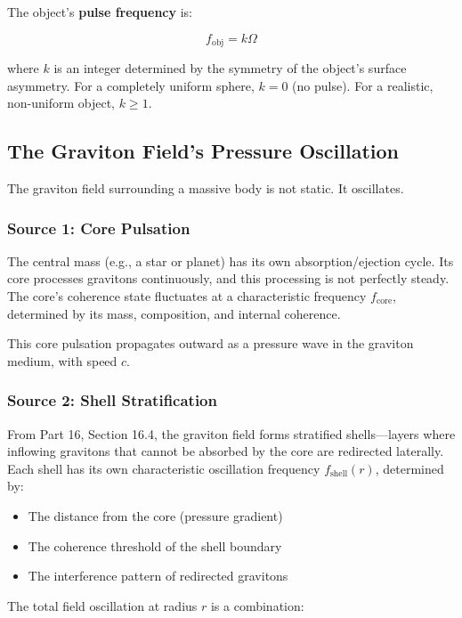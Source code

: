 \documentclass[12pt, a4paper]{article}
\begin{document}
The object's \textbf{pulse frequency} is:

\[
f_{\text{obj}} = k\Omega
\]

where \( k \) is an integer determined by the symmetry of the object's surface asymmetry. For a completely uniform sphere, \( k = 0 \) (no pulse). For a realistic, non-uniform object, \( k \geq 1 \).

\subsection{The Graviton Field's Pressure Oscillation}
\label{subsec:field_oscillation}

The graviton field surrounding a massive body is not static. It oscillates.

\subsubsection{Source 1: Core Pulsation}

The central mass (e.g., a star or planet) has its own absorption/ejection cycle. Its core processes gravitons continuously, and this processing is not perfectly steady. The core's coherence state fluctuates at a characteristic frequency \( f_{\text{core}} \), determined by its mass, composition, and internal coherence.

This core pulsation propagates outward as a pressure wave in the graviton medium, with speed \( c \).

\subsubsection{Source 2: Shell Stratification}
\label{subsec:shell_stratification}

From Part 16, Section 16.4, the graviton field forms stratified shells—layers where inflowing gravitons that cannot be absorbed by the core are redirected laterally. Each shell has its own characteristic oscillation frequency \( f_{\text{shell}}(r) \), determined by:
\begin{itemize}
    \item The distance from the core (pressure gradient)
    \item The coherence threshold of the shell boundary
    \item The interference pattern of redirected gravitons
\end{itemize}

The total field oscillation at radius \( r \) is a combination:
\end{document}
